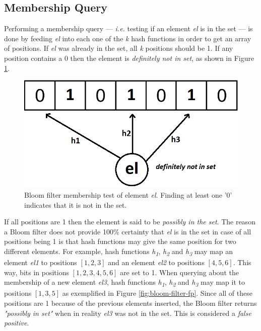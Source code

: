 \subsection*{Membership Query}
Performing a membership query --- \textit{i.e.} testing if an element \textit{el} is in the set --- is done by feeding \textit{el} into each one of the \textit{k} hash functions in order to get an array of positions. If \textit{el} was already in the set, all \textit{k} positions should be 1. If any position contains a 0 then the element is \textit{definitely not in set}, as shown in Figure \ref{fig:bloom-filter}. 

\begin{figure}[!htb]
    \begin{center}
      \includegraphics[scale=0.4]{figures/query-bloom.png}
      \caption[Bloom filter membership query]{Bloom filter membership test of element \textit{el}. Finding at least one '0' indicates that it is not in the set.}
      \label{fig:bloom-filter}
    \end{center}
\end{figure}

If all positions are 1 then the element is said to be \textit{possibly in the set}. The reason a Bloom filter does not provide 100\% certainty that \textit{el} is in the set in case of all positions being 1 is that hash functions may give the same position for two different elements. For example, hash functions \textit{h\textsubscript{1}}, \textit{h\textsubscript{2}} and \textit{h\textsubscript{3}} may map an element \textit{el1} to positions $[1,2,3]$ and an element \textit{el2} to positions $[4,5,6]$. This way, bits in positions $[1,2,3,4,5,6]$ are set to 1. When querying about the membership of a new element \textit{el3}, hash functions \textit{h\textsubscript{1}}, \textit{h\textsubscript{2}} and \textit{h\textsubscript{3}} may map it to positions $[1,3,5]$ as exemplified in Figure \ref{fig:bloom-filter-fp}. Since all of these positions are 1 because of the previous elements inserted, the Bloom filter returns \textit{"possibly in set"} when in reality \textit{el3} was not in the set. This is considered a \textit{false positive}.

